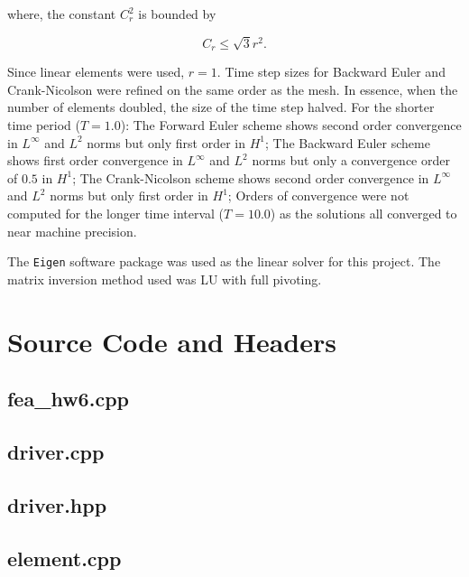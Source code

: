 \documentclass[a4paper, 12pt]{article}
\begin{document}
\noindent
where, the constant $C_r^2$ is bounded by

\begin{equation}
  C_r \leq \sqrt{3} r^2.
\end{equation}

\noindent
Since linear elements were used, $r = 1$.
Time step sizes for Backward Euler and Crank-Nicolson 
were refined on the same order as the mesh. 
In essence, when the number of elements 
doubled, the size of the time step halved.
For the shorter time period ($T=1.0$):
The Forward Euler scheme shows 
second order convergence in $L^\infty$ 
and $L^2$ norms but only
first order in $H^1$;
The Backward Euler scheme shows 
first order convergence in $L^\infty$ 
and $L^2$ norms but only
a convergence order of $0.5$ in $H^1$;
The Crank-Nicolson scheme shows 
second order convergence in $L^\infty$ 
and $L^2$ norms but only
first order in $H^1$;
Orders of convergence were not computed for
the longer time interval ($T=10.0$) 
as the solutions all converged to 
near machine precision.


The \texttt{Eigen} software package
was used as the linear solver for this project. 
The matrix inversion method used was LU with full pivoting.

\newpage
\appendix
\section{Source Code and Headers} \label{sec:code}

\subsection{fea\_hw6.cpp} \label{subsec:fea_hw6.cpp}


\subsection{driver.cpp} \label{subsec:driver.cpp}

\subsection{driver.hpp} \label{subsec:driver.hpp}


\subsection{element.cpp} \label{subsec:element.cpp}

\end{document}
